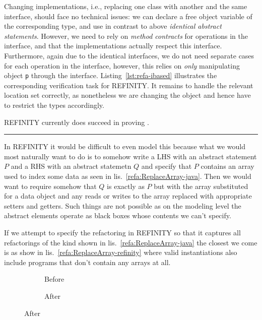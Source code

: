 Changing implementations, i.e., replacing one class with another and the same interface,
should face no technical issues: we can declare a free object variable of the corresponding type,
and use in contrast to above \textit{identical abstract statements}.
However, we need to rely on \textit{method contracts} for operations in the interface, and that the implementations actually respect this interface.
Furthermore, again due to the identical interfaces, we do not need separate cases for each operation in the interface,
however, this relies on \textit{only} manipulating object \texttt{p} through the interface.
Listing~\ref{lst:refa-ibased} illustrates the corresponding verification task for REFINITY.
It remains to handle the relevant location set correctly, as nonetheless we are changing the object and hence have to restrict the types accordingly.

REFINITY currently does  succeed in proving .

\noindent\rule{\textwidth}{2pt}


In REFINITY it would be difficult to even model this because what we would most naturally want to do is to somehow write a LHS with an abstract statement $P$ and a RHS with an abstract statemetn $Q$ and specify that $P$ contains an array used to index some data as seen in lis.~\ref{refa:ReplaceArray-java}. Then we would want to require somehow that $Q$ is exactly as $P$ but with the array substituted for a data object and any reads or writes to the array replaced with appropriate setters and getters. Such things are not possible as on the modeling level the abstract elements operate as black boxes whose contents we can't specify.

If we attempt to specify the refactoring in REFINITY so that it captures all refactorings of the kind shown in lis.~\ref{refa:ReplaceArray-java} the closest we come is as show in lis.~\ref{refa:ReplaceArray-refinity} where valid instantiations
also include programs that don't contain any arrays at all.

\begin{figure}
  \begin{subfigure}[b]{.45\linewidth} 
    
    \caption{Before}
    \label{refa:ReplaceArray-refinity-before}   
  \end{subfigure}\hfill
  \begin{subfigure}[b]{.45\linewidth}
    
    \caption{After}
    \label{refa:ReplaceArray-refinity--after}
  \end{subfigure}
  \label{lst:ReplaceArray-refinity}
\end{figure}

